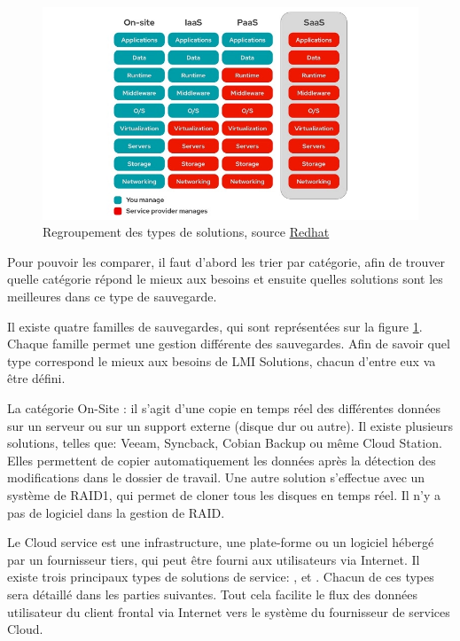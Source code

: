 \documentclass[pfe]{tnreport} %
\begin{document}
\begin{figure}[ht]
 \centering
 \includegraphics[width=19cm]{figures/comparatif_sauvegarde.png}
 \caption{Regroupement des types de solutions, source 
 \href{https://www.redhat.com/en/topics/cloud-computing/public-cloud-vs-private-cloud-and-hybrid-cloud}{Redhat}}
 \label{fig:famille}
\end{figure}
Pour pouvoir les comparer, il faut d'abord les trier par catégorie, afin de trouver quelle catégorie répond le mieux aux besoins et ensuite quelles solutions sont les meilleures dans ce type de sauvegarde. \newline


Il existe quatre familles de sauvegardes, qui sont représentées sur la figure \ref{fig:famille}. \newline
Chaque famille permet une gestion différente des sauvegardes. \newline Afin de savoir quel type correspond le mieux aux besoins de LMI Solutions, chacun d'entre eux va être défini.

La catégorie On-Site : il s'agit d'une copie en temps réel des différentes données sur un serveur ou sur un support externe (disque dur ou autre). Il existe plusieurs solutions, telles que: Veeam, Syncback, Cobian Backup ou même Cloud Station.\newline
Elles permettent de copier automatiquement les données après la détection des modifications dans le dossier de travail. \newline
Une autre solution s'effectue avec un système de RAID1, qui permet de cloner tous les disques en temps réel. Il n'y a pas de logiciel dans la gestion de RAID.\newline

Le Cloud service est une infrastructure, une plate-forme ou un logiciel hébergé par un fournisseur tiers, qui peut être fourni aux utilisateurs via Internet.\newline
Il existe trois principaux types de solutions de service: ,  et . \newline
Chacun de ces types sera détaillé dans les parties suivantes. \newline
Tout cela facilite le flux des données utilisateur du client frontal via Internet vers le système du fournisseur de services Cloud.
\end{document}
